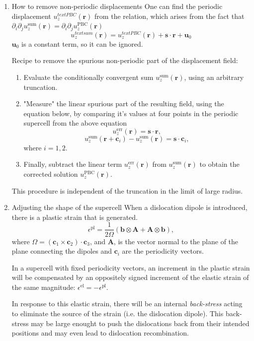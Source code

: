 \documentclass[11pt]{article}
\begin{document}
\begin{enumerate}
\begin{enumerate}
\item How to remove non-periodic displacements
\label{sec:org053a1ec}
One can find the periodic displacement \(u_{z}^{text{PBC}}(\mathbf{r})\)
from the relation, which arises from the fact that
\(\partial_{i}\partial_{j}u_{z}^{\text{sum}}(\mathbf{r}) = \partial_{i}\partial_{j}u_{z}^{\text{PBC}}(\mathbf{r})\)
\[ u_{z}^{text{sum}}(\mathbf{r}) =  u_{z}^{text{PBC}}(\mathbf{r}) +
     \mathbf{s}\cdot\mathbf{r} + \mathbf{u}_{0} \]
\(\mathbf{u}_{0}\) is a constant term, so it can be ignored. 

Recipe to remove the spurious non-periodic part of the displacement field:
\begin{enumerate}
\item Evaluate the conditionally convergent sum
\(u_{z}^{\text{sum}}(\mathbf{r})\), using an arbitrary truncation.
\item "Measure" the linear spurious part of the resulting field, using the
equation below, by comparing it's values at four points in the
periodic supercell from the above equation 
\[ u_{z}^{\text{err}}(\mathbf{r}) =  \mathbf{s}\cdot\mathbf{r},  \]
\[ u_{z}^{\text{sum}}(\mathbf{r} + \mathbf{c}_{i})  -
        u_{z}^{\text{sum}}(\mathbf{r}) = \mathbf{s}\cdot\mathbf{c}_{i}, \]
where \(i=1,2\).
\item Finally, subtract the linear term \(u_{z}^{\text{err}}(\mathbf{r})\) from
\(u_{z}^{\text{sum}}(\mathbf{r})\) to obtain the corrected solution
\(u_{z}^{\text{PBC}}(\mathbf{r})\).
\end{enumerate}


This procedure is independent of the truncation in the limit of large
radius.

\item Adjusting the shape of the supercell
\label{sec:org127e336}
When a dislocation dipole is introduced, there is a plastic strain that
is generated. 
\[ \epsilon^{\text{pl}} = \frac{1}{2\Omega}( \mathbf{b} \otimes
     \mathbf{A} + \mathbf{A} \otimes \mathbf{b} ), \]
where \(\Omega = (\mathbf{c}_{1} \times \mathbf{c}_{2}) \cdot
     \mathbf{c}_{3}\), and \(\mathbf{A}\), is the vector normal to the plane of
the plane connecting the dipoles and \(\mathbf{c}_{i}\) are the periodicity vectors. 

In a supercell with fixed periodicity vectors, an increment in the
plastic strain will be compensated by an oppositely signed increment of
the elastic strain of the same magnitude: \(\epsilon^{\text{el}} = -
     \epsilon^{\text{pl}}\).

In response to this elastic strain, there will be an internal
\emph{back-stress} acting to eliminate the source of the strain (i.e. the
dislocation dipole). This back-stress may be large enought to push the
dislocations back from their intended positions and may even lead to
dislocation recombination. 


\end{enumerate}
\end{enumerate}
\end{document}
